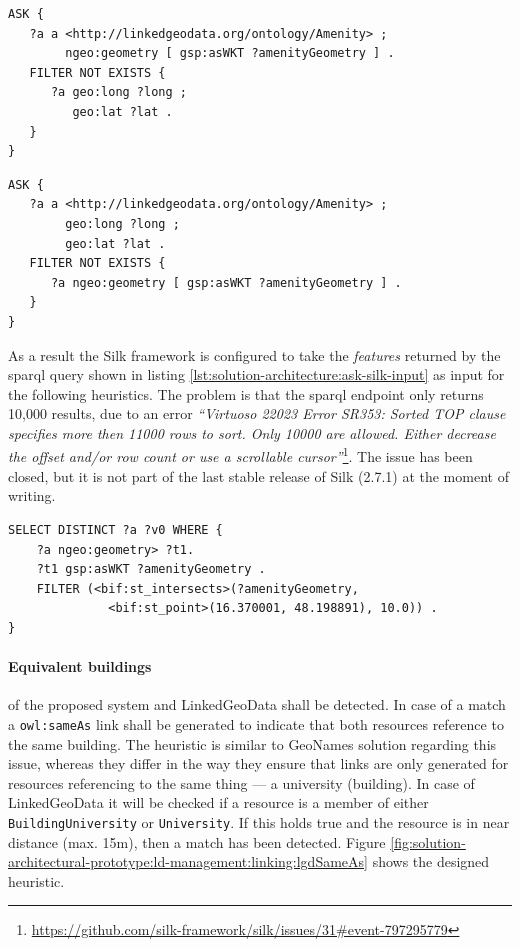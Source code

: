 \documentclass[draft,final]{vutinfth} %
\begin{document}
\begin{lstlisting}[language=sparql, frame=single, basicstyle=\footnotesize, caption=Ask if there is a feature with a geometry instance that has no location point., label={lst:solution-architecture:ask-geometry-location-point}]
ASK {
   ?a a <http://linkedgeodata.org/ontology/Amenity> ;
        ngeo:geometry [ gsp:asWKT ?amenityGeometry ] .
   FILTER NOT EXISTS {
      ?a geo:long ?long ;
         geo:lat ?lat .
   }
}
\end{lstlisting}

\begin{lstlisting}[language=sparql, frame=single, basicstyle=\footnotesize, caption=Ask if there is a feature with a location point that has no geometry instance., label={lst:solution-architecture:ask-location-point-geometry}]
ASK {
   ?a a <http://linkedgeodata.org/ontology/Amenity> ;
        geo:long ?long ;
        geo:lat ?lat .
   FILTER NOT EXISTS {
      ?a ngeo:geometry [ gsp:asWKT ?amenityGeometry ] .
   }
}
\end{lstlisting}

As a result the Silk framework is configured to take the \textit{features} returned by the \gls{sparql} query shown in listing \ref{lst:solution-architecture:ask-silk-input} as input for the following heuristics. The problem is that the \gls{sparql} endpoint only returns 10,000 results, due to an error \textit{``Virtuoso 22023 Error SR353: Sorted TOP clause specifies more then 11000 rows to sort. Only 10000 are allowed. Either decrease the offset and/or row count or use a scrollable cursor''}\footnote{\url{https://github.com/silk-framework/silk/issues/31\#event-797295779}}. The issue has been closed, but it is not part of the last stable release of Silk (2.7.1) at the moment of writing.

\begin{lstlisting}[language=sparql, frame=single, basicstyle=\footnotesize, caption=Query for preparing the input for linking., label={lst:solution-architecture:ask-silk-input}]
SELECT DISTINCT ?a ?v0 WHERE {
	?a ngeo:geometry> ?t1. 
	?t1 gsp:asWKT ?amenityGeometry .
	FILTER (<bif:st_intersects>(?amenityGeometry,
			  <bif:st_point>(16.370001, 48.198891), 10.0)) .
}
\end{lstlisting}

\paragraph{Equivalent buildings} of the proposed system and LinkedGeoData shall be detected. In case of a match a \texttt{owl:sameAs} link shall be generated to indicate that both resources reference to the same building. The heuristic is similar to GeoNames solution regarding this issue, whereas they differ in the way they ensure that links are only generated for resources referencing to the same thing --- a university (building). In case of LinkedGeoData it will be checked if a resource is a member of either \texttt{BuildingUniversity} or \texttt{University}. If this holds true and the resource is in near distance (max. 15m), then a match has been detected. Figure \ref{fig:solution-architectural-prototype:ld-management:linking:lgdSameAs} shows the designed heuristic.
\end{document}
